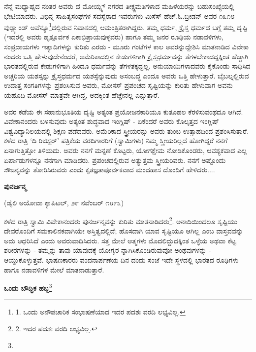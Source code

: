 ನೆನ್ನೆ ಮಧ್ಯಾಹ್ನದ ನಂತರ ಅವರು ದೆ ಮೋಯ್ನ್ಸ್ ನಗರದ ತೀಕ್ಷ್ಣಮತಿಗಳಾದ ಮಹಿಳೆಯರನ್ನು ಬಹುಸಂಖ್ಯೆಯಲ್ಲಿ ಭೇಟಿಯಾದರು. ವಿಭಿನ್ನ ಸಾಹಿತ್ಯಸಂಘಗಳ ಸದಸ್ಯೆರಾದ ಇವರುಗಳು ಮಿಸೆಸ್ ಹೆಚ್.ಓ.ಬ್ರೀಡನ್ ಅವರ ೧೩೧೮ ವುಡ್ಲ್ಯಾಂಡ್ ಅವೆನ್ಯೂ\footnote{1. ಒಂದು ಅನೌಪಚಾರಿಕ ಸಂಭಾಷಣೆಯಾದ ಇದರ ಪದಶಃ ವರದಿ ಲಭ್ಯವಿಲ್ಲ.}ದಲ್ಲಿರುವ ನಿವಾಸದಲ್ಲಿ ಆಮಂತ್ರಿತರಾಗಿದ್ದರು. ತಮ್ಮ ಧರ್ಮ, ಕ್ರೈಸ್ತ ಧರ್ಮದ ಬಗ್ಗೆ ತಮ್ಮ ದೃಷ್ಟಿ (ಇದರಲ್ಲಿ ಅವರು ಹೃತ್ಪೂರ್ವಕ ಏಕಾಭಿಪ್ರಾಯವುಳ್ಳವರು) ಹಾಗೂ ತಮ್ಮ ಜನರ ರೂಢಿಯ ನಡಾವಳಿಗಳು, ಸಂಪ್ರದಾಯಗಳು ಇತ್ಯಾದಿಗಳನ್ನು ಕುರಿತು ಎರಡು - ಮೂರು ಗಂಟೆಗಳ ಕಾಲ ಅವರನ್ನುದ್ದೇಶಿಸಿ ಮಾತನಾಡಿದ ವಿವೇಕಾ ನಂದರು ಒತ್ತಿ ಹೇಳುವುದೇನೆಂದರೆ, ಅಮೆರಿಕಾದಲ್ಲಿನ ಕೇಡುಗಳಿಗಾಗಿ ಕ್ರೈಸ್ತಧರ್ಮವನ್ನು ತೆಗಳಬೇಕಾದದ್ದಕ್ಕಿಂತ ಹೆಚ್ಚಾಗಿ ಭಾರತದಲ್ಲಿರುವ ಕೇಡುಗಳಿಗಾಗಿ ಹಿಂದೂ ಧರ್ಮವನ್ನು ತೆಗಳತಕ್ಕದ್ದಲ್ಲ. ಅನುಯಾಯಿಗಳಾದವರು ಕೈಕೊಂಡು ಸಾಧಿಸಿದ ಅಚ್ಚರಿಯ ಯಶಸ್ಸನ್ನು ಕ್ರೈಸ್ತಧರ್ಮದ ಯಶಸ್ಸೆನ್ನುವುದು ಅಸಂಬದ್ಧ ಎಂದೂ ಅವರು ಒತ್ತಿ ಹೇಳುತ್ತಾರೆ. ಬೈಬಲ್ನಲ್ಲಿರುವ ಉದಾತ್ತ ಸಂಗತಿಗಳನ್ನು ಪ್ರಶಂಸಿಸುವ ಅವರು, ಮೋಸಸ್ ಪ್ರಪಂಚದ ಸೃಷ್ಟಿಯನ್ನು ಕುರಿತು ಹೇಳುವಾಗ ಅವನು ಯಹೂದಿ ಮೋಸಸ್ ಮಾತ್ರವೇ ಆಗಿದ್ದ, ಅದಕ್ಕಿಂತ ಹೆಚ್ಚೇನಲ್ಲ ಎನ್ನುತ್ತಾರೆ.

ಅವರ ಕಡೆಯ ಈ ಸಹಾನುಭೂತಿಯ ದೃಷ್ಟಿ ಅತ್ಯಂತ ಪ್ರಯೋಜನಕಾರಿಯೂ ಕುತೂಹಲ ಕೆರಳಿಸುವಂಥದೂ ಆಗಿದೆ. ವಿವೇಕಾನಂದರು ಬಳಸುವುದು ಅತ್ಯಂತ ಶುದ್ಧವಾದ ಇಂಗ್ಲಿಷ್ - ಏಕೆಂದರೆ ಅವರು ಕೊಲ್ಕತ್ತದ ಇಂಗ್ಲಿಷ್ ವಿಶ್ವವಿದ್ಯಾನಿಲಯದಲ್ಲಿ ಶಿಕ್ಷಣ ಪಡೆದವರು. ಅಮೆರಿಕಾದ ಸ್ತ್ರೀಯರನ್ನು ಅವರು ತುಂಬ ಉತ್ಸಾಹದಿಂದ ಪ್ರಶಂಸಿಸುತ್ತಾರೆ. ಕಳೆದ ರಾತ್ರಿ ‘ದಿ ರಿಜಿಸ್ಟರ್’ ಪತ್ರಿಕೆಯ ವರದಿಗಾರರಿಗೆ (ಸ್ವಾಮಿಗಳು) ನಿಮ್ಮ ಸ್ತ್ರೀಯರಿಲ್ಲದೆ ಹೋಗಿದ್ದರೆ ನನಗೆ ಏನಾಗುತ್ತಿತ್ತೋ ತಿಳಿಯದು. ಅವರು ನನಗೆ ಮನ್ನಣೆ ಕೊಟ್ಟರು, ಯೋಗಕ್ಷೇಮ ನೋಡಿಕೊಂಡರು, ಆವಶ್ಯಕವಾದ ಎಲ್ಲ ಏರ್ಪಾಡುಗಳನ್ನೂ ನನಗಾಗಿ ಮಾಡಿದರು. ಪ್ರಪಂಚದಲ್ಲಿರುವ ಅತ್ಯುತ್ತಮ ಸ್ತ್ರೀಯರಿವರು. ನನಗೆ ಅಷ್ಟೊಂದು ಸೌಜನ್ಯವನ್ನು ತೋರಿಸಿರುವರು ಎಂದು ಕೃತಜ್ಞತಾಪೂರ್ವಕವಾದ ಮಂದಹಾಸ ದೊಂದಿಗೆ ಹೇಳಿದರು....

\begin{center}
\textbf{ಪುನರ್ಜನ್ಮ}
\end{center}

\begin{center}
(ಡೈಲಿ ಅಯೋವಾ ಕ್ಯಾಪಿಟಲ್, ೨೯ ನವೆಂಬರ್ ೧೮೯೩)
\end{center}

ಕಳೆದ ರಾತ್ರಿ ಸ್ವಾಮಿ ವಿವೇಕಾನಂದರು ಪುನರ್ಜನ್ಮವನ್ನು ಕುರಿತು ಮಾತನಾಡಿದರು\footnote{2. ಇದರ ಪದಶಃ ವರದಿ ಲಭ್ಯವಿಲ್ಲ.}. ಅನಾದಿಯಿಂದಲೂ ಸೃಷ್ಟಿಯು ದೇವರೊಂದಿಗೆ ಸಮಕಾಲಿನಕವಾಗಿಯೇ ಅಸ್ತಿತ್ವದಲ್ಲಿದೆ; ಹೊಸದಾಗಿ ಯಾವ ಸೃಷ್ಟಿಯೂ ಆಗಿಲ್ಲ ಎಂಬ ವಾಸ್ತವವನ್ನು ಅದು ಆಧರಿಸಿದೆ ಎಂದು ಅವರುವಾದಿಸಿದರು. ಸತ್ತ ಮೇಲೆ ಆತ್ಮಗಳು ಮೊದಲಿದ್ದುದಕ್ಕಿಂತ ಒಳ್ಳೆಯ ಅಥವಾ ಕೆಟ್ಟ ಶರೀರಗಳನ್ನು - ತಮ್ಮನ್ನು ತಾವು ಯಾವುದಕ್ಕೆ ಯೋಗ್ಯರ ನ್ನಾಗಿಸಿಕೊಂಡಿರುವುವೋ ಅಂಥವುಗಳನ್ನು - ಆಯ್ದುಕೊಳ್ಳುತ್ತವೆ. ಭಾಷಣಕಾರರು ವಂದನಾರ್ಪಣೆಯ ದಿನ  ದಂದು ಸಂಜೆ ಇದೇ ಸ್ಥಳದಲ್ಲಿ ಭಾರತದ ರೂಢಿಗಳು ಹಾಗೂ ನಡಾವಳಿಗಳ ಮೇಲೆ ಮಾತನಾಡುತ್ತಾರೆ.

\begin{center}
\textbf{ಒಂದು ಬೌದ್ಧಿಕ ಹಬ್ಬ}\footnote{}
\end{center}

